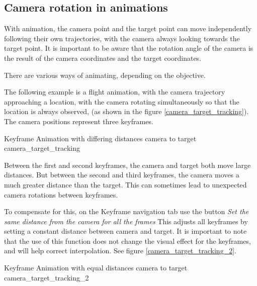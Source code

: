 \subsection{Camera rotation in animations}\label{camera-rotation-in-animations}

With animation, the camera point and the target point can move independently
following their own trajectories, with the camera always looking towards the
target point. It is important to be aware that the rotation angle of the camera
is the result of the camera coordinates and the target coordinates.

There are various ways of animating, depending on the objective.

The following example is a flight animation, with the camera trajectory
approaching a location, with the camera rotating simultaneously so that the
location is always observed, (as shown in the figure \ref{camera_target_tracking}). The camera
positions represent three keyframes.

{Keyframe Animation with differing distances camera to target}
{camera_target_tracking}

Between the first and second keyframes, the camera and target both move large
distances. But between the second and third keyframes, the camera moves a much
greater distance than the target. This can sometimes lead to unexpected camera
rotations between keyframes.

To compensate for this, on the Keyframe navigation tab use the button \emph{Set the
same distance from the camera for all the frames} This adjusts all keyframes by
setting a constant distance between camera and target. It is important to note
that the use of this function does not change the visual effect for the
keyframes, and will help correct interpolation. See figure \ref{camera_target_tracking_2}.

{Keyframe Animation with equal distances camera to target}
{camera_target_tracking_2}
